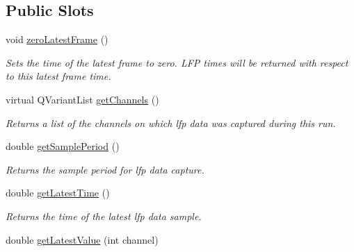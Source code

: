 \subsection*{Public Slots}
\begin{DoxyCompactItemize}
\item 
\hypertarget{class_picto_1_1_analysis_lfp_data_aa169f573782cd2f9a21735e4995aa63f}{void \hyperlink{class_picto_1_1_analysis_lfp_data_aa169f573782cd2f9a21735e4995aa63f}{zero\-Latest\-Frame} ()}\label{class_picto_1_1_analysis_lfp_data_aa169f573782cd2f9a21735e4995aa63f}

\begin{DoxyCompactList}\small\item\em Sets the time of the latest frame to zero. L\-F\-P times will be returned with respect to this latest frame time. \end{DoxyCompactList}\item 
\hypertarget{class_picto_1_1_analysis_lfp_data_ad3060e0658f2d7ca36e55fba037cd0ed}{virtual Q\-Variant\-List \hyperlink{class_picto_1_1_analysis_lfp_data_ad3060e0658f2d7ca36e55fba037cd0ed}{get\-Channels} ()}\label{class_picto_1_1_analysis_lfp_data_ad3060e0658f2d7ca36e55fba037cd0ed}

\begin{DoxyCompactList}\small\item\em Returns a list of the channels on which lfp data was captured during this run. \end{DoxyCompactList}\item 
\hypertarget{class_picto_1_1_analysis_lfp_data_a4c96e05c4e349b6a0d3be781bdeee401}{double \hyperlink{class_picto_1_1_analysis_lfp_data_a4c96e05c4e349b6a0d3be781bdeee401}{get\-Sample\-Period} ()}\label{class_picto_1_1_analysis_lfp_data_a4c96e05c4e349b6a0d3be781bdeee401}

\begin{DoxyCompactList}\small\item\em Returns the sample period for lfp data capture. \end{DoxyCompactList}\item 
\hypertarget{class_picto_1_1_analysis_lfp_data_accdab416060a16bd241c02cd773b28e6}{double \hyperlink{class_picto_1_1_analysis_lfp_data_accdab416060a16bd241c02cd773b28e6}{get\-Latest\-Time} ()}\label{class_picto_1_1_analysis_lfp_data_accdab416060a16bd241c02cd773b28e6}

\begin{DoxyCompactList}\small\item\em Returns the time of the latest lfp data sample. \end{DoxyCompactList}\item 
\hypertarget{class_picto_1_1_analysis_lfp_data_ad094dd1b756e8a6eb07206dcac379831}{double \hyperlink{class_picto_1_1_analysis_lfp_data_ad094dd1b756e8a6eb07206dcac379831}{get\-Latest\-Value} (int channel)}\label{class_picto_1_1_analysis_lfp_data_ad094dd1b756e8a6eb07206dcac379831}


\end{DoxyCompactItemize}
